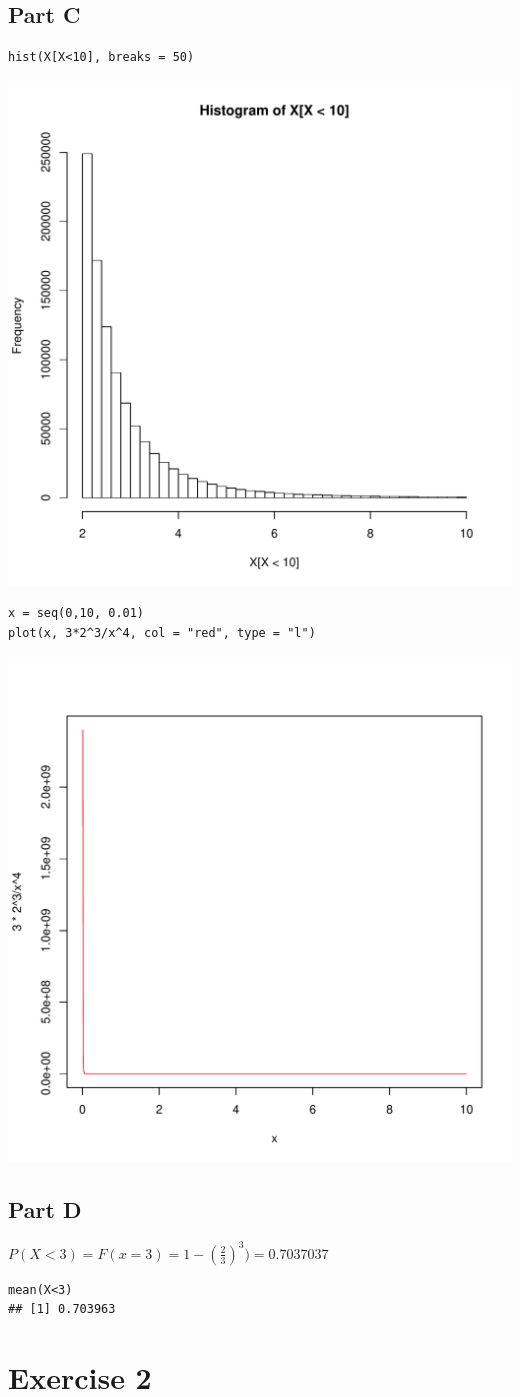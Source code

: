 \documentclass{article}\usepackage[]{graphicx}\usepackage[]{color}
\makeatletter
\newenvironment{kframe}{%
 \def\at@end@of@kframe{}%
 \ifinner\ifhmode%
  \def\at@end@of@kframe{\end{minipage}}%
  \begin{minipage}{\columnwidth}%
 \fi\fi%
 \def\FrameCommand##1{\hskip\@totalleftmargin \hskip-\fboxsep
 \colorbox{shadecolor}{##1}\hskip-\fboxsep
     \hskip-\linewidth \hskip-\@totalleftmargin \hskip\columnwidth}%
 \MakeFramed {\advance\hsize-\width
   \@totalleftmargin\z@ \linewidth\hsize
   \@setminipage}}%
 {\par\unskip\endMakeFramed%
 \at@end@of@kframe}
\newenvironment{knitrout}{}{} %
\makeatother
\begin{document}
\subsection*{Part C}
\begin{knitrout}
\color{fgcolor}\begin{kframe}
\begin{verbatim}
hist(X[X<10], breaks = 50)
\end{verbatim}
\end{kframe}
\includegraphics[width=0.50\linewidth]{figure/unnamed-chunk-3-1} 
\begin{kframe}\begin{verbatim}
x = seq(0,10, 0.01)
plot(x, 3*2^3/x^4, col = "red", type = "l")
\end{verbatim}
\end{kframe}
\includegraphics[width=0.50\linewidth]{figure/unnamed-chunk-3-2} 

\end{knitrout}
\subsection*{Part D}
$P(X<3)=F(x=3)=1-(\frac{2}{3})^{3})=0.7037037$
\begin{knitrout}
\color{fgcolor}\begin{kframe}
\begin{verbatim}
mean(X<3)
## [1] 0.703963
\end{verbatim}
\end{kframe}
\end{knitrout}
\newpage
\section*{Exercise 2}
\end{document}
